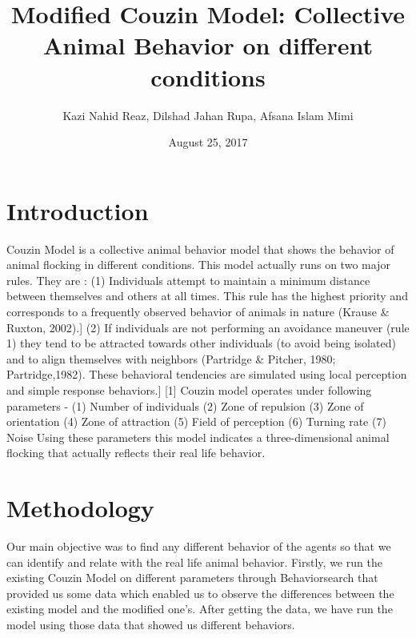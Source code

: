 \documentclass{article}
\title{Modified Couzin Model: Collective Animal Behavior on different conditions}
\author{Kazi Nahid Reaz, Dilshad Jahan Rupa, Afsana Islam Mimi}
\date{August 25, 2017}
\begin{document}
\maketitle


\section{Introduction}

Couzin Model is a collective animal behavior model that shows  the behavior of animal flocking in different conditions. This model actually runs on two major rules. They are :
(1) Individuals attempt to maintain a minimum distance between themselves and others at all times. This rule has the highest priority and corresponds to a frequently observed behavior of animals in nature (Krause \& Ruxton, 2002).]
(2) If individuals are not performing an avoidance maneuver (rule 1) they tend to be attracted towards other individuals (to avoid being isolated) and to align themselves with neighbors (Partridge \& Pitcher, 1980; Partridge,1982). These behavioral tendencies are simulated using local perception and simple response behaviors.] [1]
Couzin model operates under following parameters - 
(1) Number of individuals
(2) Zone of repulsion
(3) Zone of orientation
(4) Zone of attraction
(5) Field of perception
(6) Turning rate
(7) Noise
Using these parameters this model indicates a three-dimensional animal flocking that actually reflects their real life behavior. 


\section{Methodology}
Our main objective was to find any different behavior of the agents so that we can identify and relate with the real life animal behavior. Firstly, we run the existing Couzin Model on different parameters through Behaviorsearch that provided us some data which enabled us to observe the differences between the existing model and the modified one's. After getting the data, we have run the model using those data that showed us different behaviors.  
\end{document}
